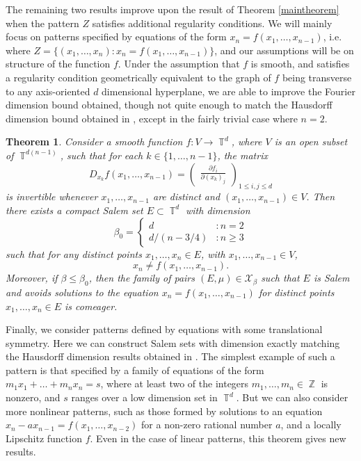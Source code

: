 \documentclass[dvipsnames,letterpaper,12pt]{article}
\numberwithin{equation}{section}
\DeclareMathOperator{\ZZ}{\mathbb{Z}}
\DeclareMathOperator{\TT}{\mathbb{T}}
\newtheorem{theorem}{Theorem}
\numberwithin{theorem}{section}
\begin{document}
The remaining two results improve upon the result of Theorem \ref{maintheorem} when the pattern $Z$ satisfies additional regularity conditions. We will mainly focus on patterns specified by equations of the form $x_n = f(x_1,\dots,x_{n-1})$, i.e. where $Z = \{ (x_1,\dots,x_n): x_n = f(x_1,\dots,x_{n-1}) \}$, and our assumptions will be on structure of the function $f$. Under the assumption that $f$ is smooth, and satisfies a regularity condition geometrically equivalent to the graph of $f$ being transverse to any axis-oriented $d$ dimensional hyperplane, we are able to improve the Fourier dimension bound obtained, though not quite enough to match the Hausdorff dimension bound obtained in \cite{PramanikFraser}, except in the fairly trivial case where $n = 2$.

\begin{theorem} \label{theoremJOICVIOJVI122}
    Consider a smooth function $f: V \to \TT^d$, where $V$ is an open subset of $\TT^{d(n-1)}$, such that for each $k \in \{ 1, \dots, n-1 \}$, the matrix
    \[ D_{x_k} f(x_1,\dots,x_{n-1}) = \begin{pmatrix} \frac{\partial f_i}{\partial (x_k)_j} \end{pmatrix}_{1 \leq i,j \leq d} \]
    is invertible whenever $x_1,\dots,x_{n-1}$ are distinct and $(x_1,\dots,x_{n-1}) \in V$. Then there exists a compact Salem set $E \subset \TT^d$ with dimension
    \[ \beta_0 = \begin{cases} d &: n = 2 \\ d/(n - 3/4) &: n \geq 3 \end{cases} \]
    such that for any distinct points $x_1, \dots, x_n \in E$, with $x_1,\dots,x_{n-1} \in V$,
    \[ x_n \neq f(x_1,\dots,x_{n-1}). \]
    Moreover, if $\beta \leq \beta_0$, then the family of pairs $(E,\mu) \in \mathcal{X}_\beta$ such that $E$ is Salem and avoids solutions to the equation $x_n = f(x_1,\dots,x_{n-1})$ for distinct points $x_1,\dots,x_n \in E$ is comeager.
\end{theorem}

Finally, we consider patterns defined by equations with some translational symmetry. Here we can construct Salem sets with dimension exactly matching the Hausdorff dimension results obtained in \cite{OurPaper}. The simplest example of such a pattern is that specified by a family of equations of the form $m_1x_1 + \dots + m_nx_n = s$, where at least two of the integers $m_1,\dots,m_n \in \ZZ$ is nonzero, and $s$ ranges over a low dimension set in $\TT^d$. But we can also consider more nonlinear patterns, such as those formed by solutions to an equation $x_n - a x_{n-1} = f(x_1,\dots,x_{n-2})$ for a non-zero rational number $a$, and a locally Lipschitz function $f$. Even in the case of linear patterns, this theorem gives new results.
\end{document}
